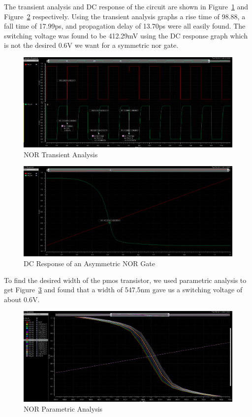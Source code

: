 \documentclass[12pt]{article}
\begin{document}
The transient analysis and DC response of the circuit are shown in Figure~\ref{fig:nor_tran} and Figure~\ref{fig:nor_dc_asymm} respectively. Using the transient analysis graphs a
rise time of 98.88, a fall time of 17.99ps, and propagation delay of 13.70ps were all easily found. The switching voltage was found to be 412.29mV using the DC response graph
which is not the desired 0.6V we want for a symmetric nor gate.
\begin{figure}[!htb]
  \centering
  \includegraphics[width=5in]{figures/nor/nor_tran.png}
  \caption{NOR Transient Analysis}\label{fig:nor_tran}
\end{figure}
\begin{figure}[!htb]
  \centering
  \includegraphics[width=5in]{figures/nor/nor_dc_asymm.png}
  \caption{DC Response of an Asymmetric NOR Gate}\label{fig:nor_dc_asymm}
\end{figure}
To find the desired width of the pmos transistor, we used parametric analysis to get Figure~\ref{fig:nor_param} and found that a width of 547.5nm gave us a switching voltage of
about 0.6V.
\begin{figure}[!htb]
  \centering
  \includegraphics[width=5in]{figures/nor/nor_param.png}
  \caption{NOR Parametric Analysis}\label{fig:nor_param}
\end{figure}
\end{document}
